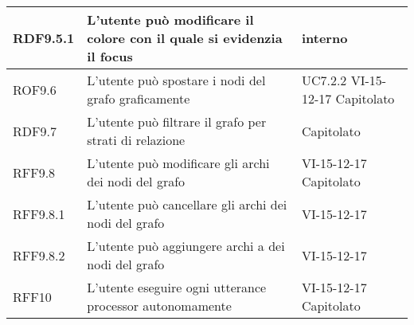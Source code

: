 \documentclass[../AnalisideiRequisiti.tex]{subfiles}
\begin{document}
\begin{longtable}{| p{3cm} | p{6cm} | p{3cm} |}
		\newline RDF9.5.1&
		\newline L'utente può modificare il colore con il quale si evidenzia il focus&
		\newline interno
		\\[1em]
		\hline
		
		\newline ROF9.6&
		\newline L'utente può spostare i nodi del grafo graficamente&
		\newline UC7.2.2 \newline VI-15-12-17 \newline Capitolato
		\\[1em]
		\hline
		
		\newline RDF9.7&
		\newline L'utente può filtrare il grafo per strati di relazione&
		\newline Capitolato
		\\[1em]
		\hline
	
		\newline RFF9.8&
		\newline L'utente può modificare gli archi dei nodi del grafo&
		\newline VI-15-12-17 \newline Capitolato
		\\[1em]
		\hline
		
		\newline RFF9.8.1&
		\newline L'utente può cancellare gli archi dei nodi del grafo&
		\newline VI-15-12-17
		\\[1em]
		\hline
		
		\newline RFF9.8.2&
		\newline L'utente può aggiungere archi a dei nodi del grafo&
		\newline VI-15-12-17 
		\\[1em]
		\hline
	
		
		\newline RFF10&
		\newline L'utente eseguire ogni utterance processor autonomamente&
		\newline VI-15-12-17 \newline Capitolato
		\\[1em]
		\hline
	
		
	

\end{longtable}
\end{document}
